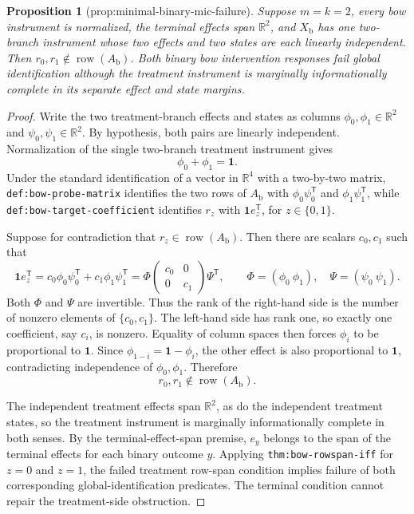 \documentclass{article}
\newtheorem{proposition}{Proposition}
\begin{document}
\begin{proposition}[prop:minimal-binary-mic-failure]\label{prop:minimal-binary-mic-failure}
Suppose \(m=k=2\), every bow instrument is normalized, the terminal effects span \(\mathbb R^2\), and \(X_{\mathrm b}\) has one two-branch instrument whose two effects and two states are each linearly independent. Then \(r_0,r_1\notin\operatorname{row}(A_{\mathrm b})\). Both binary bow intervention responses fail global identification although the treatment instrument is marginally informationally complete in its separate effect and state margins.
\end{proposition}
\begin{proof}
Write the two treatment-branch effects and states as columns \(\phi_0,\phi_1\in\mathbb R^2\) and \(\psi_0,\psi_1\in\mathbb R^2\).  By hypothesis, both pairs are linearly independent.  Normalization of the single two-branch treatment instrument gives
\[
 \phi_0+\phi_1=\mathbf 1.
\]
Under the standard identification of a vector in \(\mathbb R^4\) with a two-by-two matrix, \texttt{def:bow-probe-matrix} identifies the two rows of \(A_{\mathrm b}\) with \(\phi_0\psi_0^{\mathsf T}\) and \(\phi_1\psi_1^{\mathsf T}\), while \texttt{def:bow-target-coefficient} identifies \(r_z\) with \(\mathbf 1e_z^{\mathsf T}\), for \(z\in\{0,1\}\).

Suppose for contradiction that \(r_z\in\operatorname{row}(A_{\mathrm b})\).  Then there are scalars \(c_0,c_1\) such that
\[
 \mathbf 1e_z^{\mathsf T}
 =c_0\phi_0\psi_0^{\mathsf T}+c_1\phi_1\psi_1^{\mathsf T}
 =\Phi\begin{pmatrix}c_0&0\\0&c_1\end{pmatrix}\Psi^{\mathsf T},
 \qquad
 \Phi=(\phi_0\ \phi_1),\quad \Psi=(\psi_0\ \psi_1).
\]
Both \(\Phi\) and \(\Psi\) are invertible.  Thus the rank of the right-hand side is the number of nonzero elements of \(\{c_0,c_1\}\).  The left-hand side has rank one, so exactly one coefficient, say \(c_i\), is nonzero.  Equality of column spaces then forces \(\phi_i\) to be proportional to \(\mathbf 1\).  Since \(\phi_{1-i}=\mathbf 1-\phi_i\), the other effect is also proportional to \(\mathbf 1\), contradicting independence of \(\phi_0,\phi_1\).  Therefore
\[
 r_0,r_1\notin\operatorname{row}(A_{\mathrm b}).
\]

The independent treatment effects span \(\mathbb R^2\), as do the independent treatment states, so the treatment instrument is marginally informationally complete in both senses.  By the terminal-effect-span premise, \(e_y\) belongs to the span of the terminal effects for each binary outcome \(y\).  Applying \texttt{thm:bow-rowspan-iff} for \(z=0\) and \(z=1\), the failed treatment row-span condition implies failure of both corresponding global-identification predicates.  The terminal condition cannot repair the treatment-side obstruction.
\end{proof}
\end{document}

